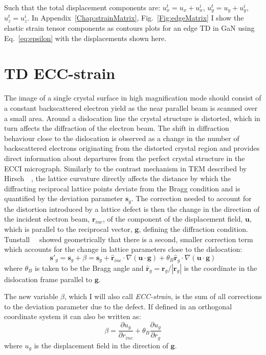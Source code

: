Such that the total displacement components are: $u^t_x = u_x + u^i_x$, $u^t_y = u_y + u^i_y$, $u^t_z =  u^i_z$. In Appendix~\ref{Chap:strainMatrix}, Fig.~\ref{Fig:edgeMatrix} I show the elastic strain tensor components as contours plots for an edge TD in GaN using Eq.~\ref{eq:epsilon}  with the displacements shown here.




\section{TD ECC-strain}
\label{sec:beta}
The image of a single crystal surface in high magnification mode should consist of a constant backscattered electron yield as the near parallel beam is scanned over a small area. Around a dislocation line the crystal structure is distorted, which in turn affects the diffraction of the electron beam. The shift in diffraction behaviour close to the dislocation is observed as a change in the number of backscattered electrons originating from the distorted crystal region and provides direct information about departures from the perfect crystal structure in the ECCI micrograph. Similarly to the contrast mechanism in TEM described by Hirsch~\etal~\cite{Hirsch60}, the lattice curvature directly affects the distance by which the diffracting reciprocal lattice points deviate from the Bragg condition and is quantified by the deviation parameter $\mathbf{s}_g$. The correction needed to account for the distortion introduced by a lattice defect is then the change in the direction of the incident electron beam, $\mathbf{r}_{inc}$, of the component of the displacement field, $\mathbf{u}$, which is parallel to the reciprocal vector, $\mathbf{g}$, defining the diffraction condition. Tunstall~\etal~\cite{Tunstall64} showed geometrically that there is a second, smaller correction term which accounts for the change in lattice parameters close to the dislocation:
\begin{equation}
\label{eq:tunstall}
    \mathbf{s}'_g = \mathbf{s}_g + \beta = \mathbf{s}_g + \mathbf{\hat{r}}_{inc} \cdot \nabla(\mathbf{u} \cdot \mathbf{g}) + \theta_B \mathbf{\hat{r}}_{g} \cdot \nabla(\mathbf{u} \cdot \mathbf{g} )
\end{equation}
where $\theta_B$ is taken to be the Bragg angle and $\mathbf{\hat{r}}_{g}=\mathbf{r}_g/ |\mathbf{r}_g|$  is the coordinate in the dislocation frame parallel to $\mathbf{g}$.

The new variable $\beta$, which I will also call \textit{ECC-strain}, is the sum of all corrections to the deviation parameter due to the defect. If defined in an orthogonal coordinate system it can also be written as:
\begin{equation}
\label{eq:beta}
   \boxed{ \beta = \frac{\partial u_g}{\partial r_{inc}} + \theta_B\frac{\partial u_g}{\partial r_g}}
\end{equation}
where $u_g$ is the displacement field in the direction of $\mathbf{g}$.

